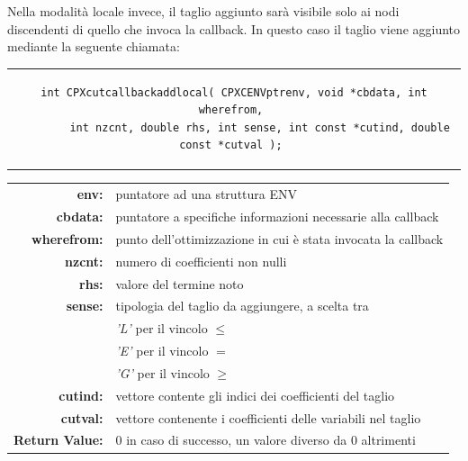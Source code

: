 Nella modalità locale invece, il taglio aggiunto sarà visibile solo ai nodi discendenti di quello che invoca la callback. In questo caso il taglio viene aggiunto mediante la seguente chiamata:
\begin{center}
\begin{tabular}{c}
\begin{lstlisting}[linewidth=400pt, basicstyle=\footnotesize\sffamily,] 
int CPXcutcallbackaddlocal( CPXCENVptrenv, void *cbdata, int wherefrom, 
		int nzcnt, double rhs, int sense, int const *cutind, double const *cutval ); 
\end{lstlisting}
\end{tabular}
\end{center}
\begin{table}[h]
\centering
\begin{tabular}{rl}
\textbf{env:} & {puntatore ad una struttura ENV}\\
\textbf{cbdata:} & {puntatore a specifiche informazioni necessarie alla callback}\\
\textbf{wherefrom:} & {punto dell'ottimizzazione in cui è stata invocata la callback} \\ 
\textbf{nzcnt:} & {numero di coefficienti non nulli} \\
\textbf{rhs:} & {valore del termine noto} \\
\textbf{sense:} & {tipologia del taglio da aggiungere, a scelta tra} \\
&{\textit{'L'} per il vincolo $\leq$}\\
&{\textit{'E'} per il vincolo $=$}\\
&{\textit{'G'} per il vincolo $\geq$}\\
\textbf{cutind:} & {vettore contente gli indici dei coefficienti del taglio} \\
\textbf{cutval:} & {vettore contenente i coefficienti delle variabili nel taglio} \\
\textbf{Return Value:} & {0 in caso di successo, un valore diverso da 0 altrimenti}\\ 
\end{tabular}
\end{table}
